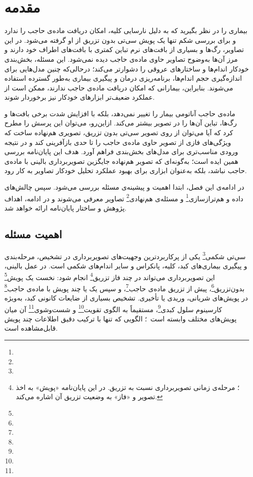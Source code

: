
\chapter{مقدمه}
\label{chap:introduction}

بیماری را در نظر بگیرید که به دلیل نارسایی کلیه، امکان دریافت ماده‌ی حاجب را ندارد و برای بررسی شکم تنها یک پویش سی‌تی بدون تزریق از او گرفته می‌شود. در این تصاویر، رگ‌ها و بسیاری از بافت‌های نرم تباین کمتری با بافت‌های اطراف خود دارند و مرز آن‌ها به‌وضوح تصاویر حاوی ماده‌ی حاجب دیده نمی‌شود. این مسئله، بخش‌بندی خودکار اندام‌ها و ساختارهای عروقی را دشوارتر می‌کند؛ درحالی‌که چنین مدل‌هایی برای اندازه‌گیری حجم اندام‌ها، برنامه‌ریزی درمان و پیگیری بیماری به‌طور گسترده استفاده می‌شوند. بنابراین، بیمارانی که امکان دریافت ماده‌ی حاجب ندارند، ممکن است از عملکرد ضعیف‌تر ابزارهای خودکار نیز برخوردار شوند.

ماده‌ی حاجب آناتومی بیمار را تغییر نمی‌دهد، بلکه با افزایش شدت برخی بافت‌ها و رگ‌ها، تباین آن‌ها را در تصویر بیشتر می‌کند. ازاین‌رو، می‌توان این پرسش را مطرح کرد که آیا می‌توان از روی تصویر سی‌تی بدون تزریق، تصویری هم‌نهاده ساخت که ویژگی‌های فازی از تصویر حاوی ماده‌ی حاجب را تا حدی بازآفرینی کند و در نتیجه ورودی مناسب‌تری برای مدل‌های بخش‌بندی فراهم آورد. هدف این پایان‌نامه بررسی همین ایده است؛ به‌گونه‌ای که تصویر هم‌نهاده جایگزین تصویربرداری بالینی با ماده‌ی حاجب نباشد، بلکه به‌عنوان ابزاری برای بهبود عملکرد تحلیل خودکار تصاویر به کار رود.

در ادامه‌ی این فصل، ابتدا اهمیت و پیشینه‌ی مسئله بررسی می‌شود. سپس چالش‌های داده و هم‌ترازسازی\footnote{} و مسئله‌ی هم‌نهادی\footnote{} تصاویر معرفی می‌شوند و در ادامه، اهداف پژوهش و ساختار پایان‌نامه ارائه خواهد شد.


\section{اهمیت مسئله}
\label{sec:importance}

سی‌تی شکمی\footnote{} یکی از پرکاربردترین وجهیت‌های تصویربرداری در تشخیص، مرحله‌بندی و پیگیری بیماری‌های کبد، کلیه، پانکراس و سایر اندام‌های شکمی است. در عمل بالینی، این تصویربرداری می‌تواند در چند فاز تزریق\footnote{؛ مرحله‌ی زمانی تصویربرداری نسبت به تزریق. در این پایان‌نامه «پویش» به اخذ تصویر و «فاز» به وضعیت تزریق آن اشاره می‌کند.} انجام شود: نخست یک پویش\footnote{} بدون‌تزریق\footnote{}، پیش از تزریق ماده‌ی حاجب\footnote{}، و سپس یک یا چند پویش با ماده‌ی حاجب\footnote{} در پویش‌های شریانی، وریدی یا تأخیری. تشخیص بسیاری از ضایعات کانونی کبد، به‌ویژه کارسینوم سلول کبدی\footnote{}، مستقیماً به الگوی تقویت\footnote{} و شست‌وشوی\footnote{} آن میان پویش‌های مختلف وابسته است~\cite{easl2018,forner2018}؛ الگویی که تنها با ترکیب دقیق اطلاعات چند پویش قابل‌مشاهده است.

